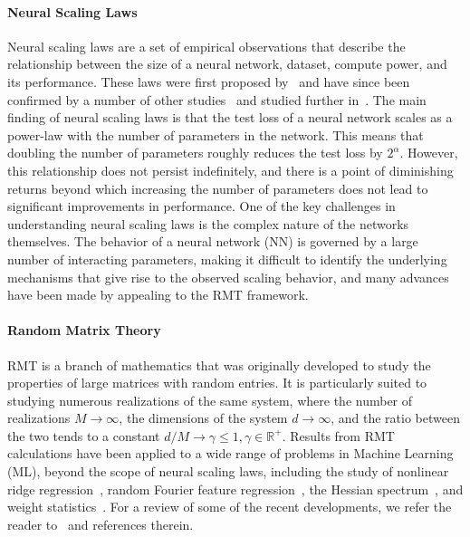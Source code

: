 \documentclass{article}
\begin{document}
\paragraph{Neural Scaling Laws}
Neural scaling laws are a set of empirical observations that describe the relationship between the size of a neural network, dataset, compute power, and its performance. These laws were first proposed by~\citet{kaplan2020scaling} and have since been confirmed by a number of other studies~\citep{maloney2022solvable, hernandez2022scaling} and studied further in~\citep{DBLP:conf/emnlp/IvgiCB22, DBLP:conf/nips/AlabdulmohsinNZ22, DBLP:journals/jmlr/SharmaK22, DBLP:conf/nips/SorscherGSGM22, DBLP:journals/corr/abs-2302-09049, DBLP:journals/corr/abs-2302-09650}.
The main finding of neural scaling laws is that the test loss of a neural network scales as a power-law with the number of parameters in the network. This means that doubling the number of parameters roughly reduces the test loss by $2^\alpha$.  However, this relationship does not persist indefinitely, and there is a point of diminishing returns beyond which increasing the number of parameters does not lead to significant improvements in performance.
One of the key challenges in understanding neural scaling laws is the complex nature of the networks themselves. The behavior of a neural network (NN) is governed by a large number of interacting parameters, making it difficult to identify the underlying mechanisms that give rise to the observed scaling behavior, and many advances have been made by appealing to the RMT framework.
%
\paragraph{Random Matrix Theory}
RMT is a branch of mathematics that was originally developed to study the properties of large matrices with random entries. It is particularly suited to studying numerous realizations of the same system, where the number of realizations $M \to \infty$, the dimensions of the system $d \to \infty$, and the ratio between the two tends to a constant $d/M \to \gamma \leq 1, \gamma \in \mathbb{R}^+$. Results from RMT calculations have been applied to a wide range of problems in Machine Learning (ML), beyond the scope of neural scaling laws, including the study of nonlinear ridge regression~\citep{pennington2017nonlinear}, random Fourier feature regression~\citep{Liao_2021}, the Hessian spectrum~\citep{liao2021hessian}, and weight statistics~\citep{martin2019traditional,Thamm}. For a review of some of the recent developments, we refer the reader to~\citet{couillet_liao_2022} and references therein.
\end{document}

